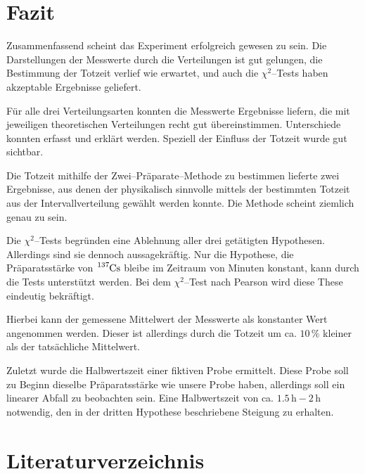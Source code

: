 \documentclass[12pt,a4paper]{scrartcl}
\numberwithin{equation}{section} %
\begin{document}
\clearpage
\hypertarget{fazit}{%
\section{Fazit}\label{fazit}}
Zusammenfassend scheint das Experiment erfolgreich gewesen zu sein. Die Darstellungen der Messwerte durch die Verteilungen ist gut gelungen, die Bestimmung der Totzeit verlief wie erwartet, und auch die $\chi^2$--Tests haben akzeptable Ergebnisse geliefert.

Für alle drei Verteilungsarten konnten die Messwerte Ergebnisse liefern, die mit jeweiligen theoretischen Verteilungen recht gut übereinstimmen. Unterschiede konnten erfasst und erklärt werden. Speziell der Einfluss der Totzeit wurde gut sichtbar.

Die Totzeit mithilfe der Zwei--Präparate--Methode zu bestimmen lieferte zwei Ergebnisse, aus denen der physikalisch sinnvolle mittels der bestimmten Totzeit aus der Intervallverteilung gewählt werden konnte. Die Methode scheint ziemlich genau zu sein.

Die $\chi^2$--Tests begründen eine Ablehnung aller drei getätigten Hypothesen. Allerdings sind sie dennoch aussagekräftig. Nur die Hypothese, die Präparatsstärke von $\ce{^{137}Cs}$ bleibe im Zeitraum von Minuten konstant, kann durch die Tests unterstützt werden. Bei dem $\chi^2$--Test nach Pearson wird diese These eindeutig bekräftigt.

Hierbei kann der gemessene Mittelwert der Messwerte als konstanter Wert angenommen werden. Dieser ist allerdings durch die Totzeit um ca. $10\,\%$ kleiner als der tatsächliche Mittelwert.

Zuletzt wurde die Halbwertszeit einer fiktiven Probe ermittelt. Diese Probe soll zu Beginn dieselbe Präparatsstärke wie unsere Probe haben, allerdings soll ein linearer Abfall zu beobachten sein. Eine Halbwertszeit von ca. $1.5\mathrm{\,h}-2\mathrm{\,h}$ notwendig, den in der dritten Hypothese beschriebene Steigung zu erhalten.

\clearpage
\hypertarget{literatur}{\section{Literaturverzeichnis}\label{literatur}}
\renewcommand{\section}[2]{}
\end{document}
